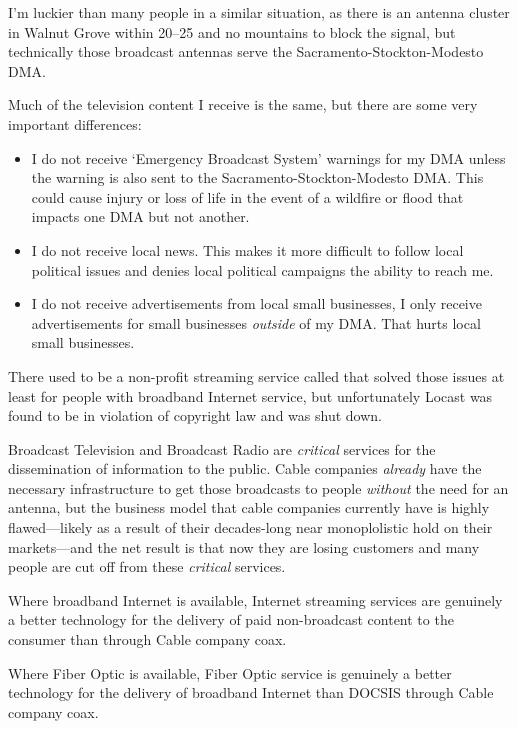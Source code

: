 I'm luckier than many people in a similar situation, as there is an antenna cluster in Walnut
Grove within \qtyrange{20}{25}{\mile} and no mountains to block the signal, but technically
those broadcast antennas serve the Sacramento-Stockton-Modesto DMA.

Much of the television content I receive is the same, but there are some very important
differences:

\begin{itemize}
  \item I do not receive `Emergency Broadcast System' warnings for my DMA unless the warning
        is also sent to the Sacramento-Stockton-Modesto DMA. This could cause injury or loss
        of life in the event of a wildfire or flood that impacts one DMA but not another.
  \item I do not receive local news. This makes it more difficult to follow local political
        issues and denies local political campaigns the ability to reach me.
  \item I do not receive advertisements from local small businesses, I only receive advertisements
        for small businesses \emph{outside} of my DMA. That hurts local small businesses.
\end{itemize}

There used to be a non-profit streaming service called 
that solved those issues at least for people with broadband Internet service, but unfortunately
Locast was found to be in violation of copyright law and was shut down.

Broadcast Television and Broadcast Radio are \emph{critical} services for the dissemination of
information to the public. Cable companies \emph{already} have the necessary infrastructure to
get those broadcasts to people \emph{without} the need for an antenna, but the business model
that cable companies currently have is highly flawed---likely as a result of their decades-long
near monoplolistic hold on their markets---and the net result is that now they are losing
customers and many people are cut off from these \emph{critical} services.

Where broadband Internet is available, Internet streaming services are genuinely a better technology
for the delivery of paid non-broadcast content to the consumer than through Cable company coax.

Where Fiber Optic is available, Fiber Optic service is genuinely a better technology for the delivery
of broadband Internet than DOCSIS through Cable company coax.

